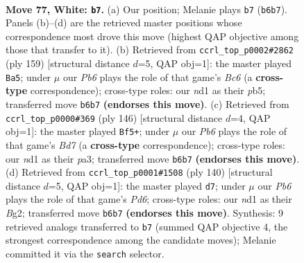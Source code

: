 \documentclass[11pt]{article}
\begin{document}
\clearpage

\begin{figure}[p]\centering
\begin{subfigure}{0.46\textwidth}\centering
\resizebox{\linewidth}{!}{%
\newchessgame
\chessboard[
  setfen={7k/8/PP2b3/8/8/6K1/8/3n4 w - - 1 77},
  showmover=false,
  pgfstyle=straightmove, color=movearrow, markmove={b6-b7}
]}
\caption{}
\end{subfigure}\hfill
\begin{subfigure}{0.46\textwidth}\centering
\resizebox{\linewidth}{!}{%
\newchessgame
\chessboard[
  setfen={8/1B1k4/8/1P3p2/8/2b5/K7/8 b - - 8 80},
  showmover=false,
  pgfstyle=straightmove, color=movearrow, markmove={c3-a5}
]}
\caption{}
\end{subfigure}
\\[4pt]
\begin{subfigure}{0.46\textwidth}\centering
\resizebox{\linewidth}{!}{%
\newchessgame
\chessboard[
  setfen={8/3B4/7P/8/8/p5K1/8/1k1b4 w - - 0 74},
  showmover=false,
  pgfstyle=straightmove, color=movearrow, markmove={d7-f5}
]}
\caption{}
\end{subfigure}\hfill
\begin{subfigure}{0.46\textwidth}\centering
\resizebox{\linewidth}{!}{%
\newchessgame
\chessboard[
  setfen={8/8/1b1P4/7k/2K5/6p1/6B1/8 w - - 4 71},
  showmover=false,
  pgfstyle=straightmove, color=movearrow, markmove={d6-d7}
]}
\caption{}
\end{subfigure}
\caption{\textbf{Move 77, White: \texttt{b7}.} (a) Our position; Melanie plays \texttt{b7} (\texttt{b6b7}). Panels (b)--(d) are the retrieved master positions whose correspondence most drove this move (highest QAP objective among those that transfer to it). (b) Retrieved from \texttt{ccrl\_top\_p0002\#2862} (ply 159) [structural distance $d$=5, QAP obj=1]: the master played \texttt{Ba5}; under $\mu$ our \emph{Pb6} plays the role of that game's \emph{Bc6} (a \textbf{cross-type} correspondence); cross-type roles: our \emph{n}d1 as their \emph{p}b5; transferred move \texttt{b6b7} \textbf{(endorses this move)}. (c) Retrieved from \texttt{ccrl\_top\_p0000\#369} (ply 146) [structural distance $d$=4, QAP obj=1]: the master played \texttt{Bf5+}; under $\mu$ our \emph{Pb6} plays the role of that game's \emph{Bd7} (a \textbf{cross-type} correspondence); cross-type roles: our \emph{n}d1 as their \emph{p}a3; transferred move \texttt{b6b7} \textbf{(endorses this move)}. (d) Retrieved from \texttt{ccrl\_top\_p0001\#1508} (ply 140) [structural distance $d$=5, QAP obj=1]: the master played \texttt{d7}; under $\mu$ our \emph{Pb6} plays the role of that game's \emph{Pd6}; cross-type roles: our \emph{n}d1 as their \emph{B}g2; transferred move \texttt{b6b7} \textbf{(endorses this move)}. Synthesis: 9 retrieved analogs transferred to \texttt{b7} (summed QAP objective 4, the strongest correspondence among the candidate moves); Melanie committed it via the \texttt{search} selector.}
\label{fig:thought-m152}
\end{figure}
\end{document}
